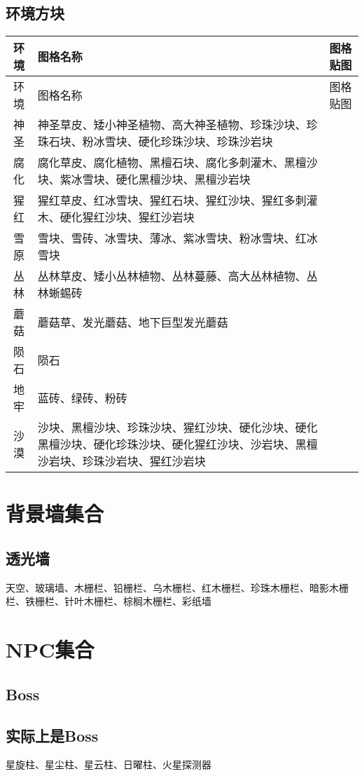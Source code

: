 \subsection{环境方块}
\begin{longtable}{|c|p{}|p{}|}
\hline 环境&图格名称&图格贴图\\\hline
\endfirsthead
\hline 环境&图格名称&图格贴图\\\hline
\endhead
\hline
\endfoot
神圣&神圣草皮、矮小神圣植物、高大神圣植物、珍珠沙块、珍珠石块、粉冰雪块、硬化珍珠沙块、珍珠沙岩块&\\\hline
腐化&腐化草皮、腐化植物、黑檀石块、腐化多刺灌木、黑檀沙块、紫冰雪块、硬化黑檀沙块、黑檀沙岩块&\\\hline
猩红&猩红草皮、红冰雪块、猩红石块、猩红沙块、猩红多刺灌木、硬化猩红沙块、猩红沙岩块&\\\hline
雪原&雪块、雪砖、冰雪块、薄冰、紫冰雪块、粉冰雪块、红冰雪块&\\\hline
丛林&丛林草皮、矮小丛林植物、丛林蔓藤、高大丛林植物、丛林蜥蜴砖&\\\hline
蘑菇&蘑菇草、发光蘑菇、地下巨型发光蘑菇&\\\hline
陨石&陨石&\\\hline
地牢&蓝砖、绿砖、粉砖&\\\hline
沙漠&沙块、黑檀沙块、珍珠沙块、猩红沙块、硬化沙块、硬化黑檀沙块、硬化珍珠沙块、硬化猩红沙块、沙岩块、黑檀沙岩块、珍珠沙岩块、猩红沙岩块
\end{longtable}

\section{背景墙集合}
\subsection{透光墙}\label{app9}
天空、玻璃墙、木栅栏、铅栅栏、乌木栅栏、红木栅栏、珍珠木栅栏、暗影木栅栏、铁栅栏、针叶木栅栏、棕榈木栅栏、彩纸墙
\section{NPC集合}
\subsection{Boss}
\subsection{实际上是Boss}\label{app10}
星旋柱、星尘柱、星云柱、日曜柱、火星探测器